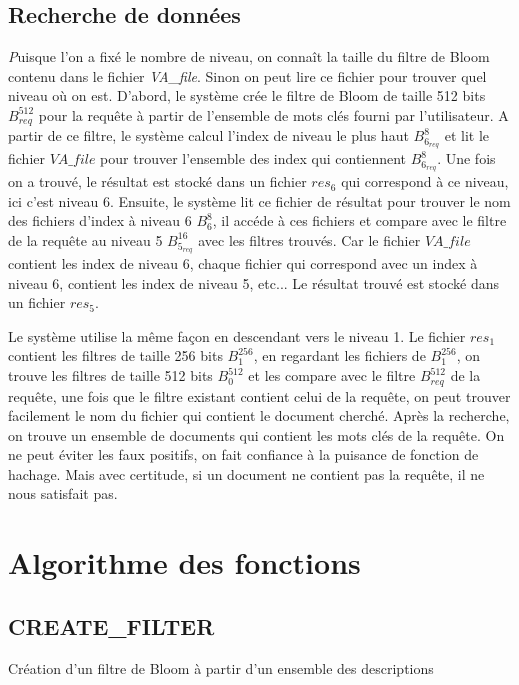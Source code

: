 \section{Recherche de données}
	{\huge \itshape P}uisque l'on a fixé le nombre de niveau, on connaît la taille du filtre de Bloom contenu dans le fichier \textit{VA\_file}. Sinon on peut lire ce fichier pour trouver quel niveau où on est. D'abord, le système crée le filtre de Bloom de taille 512 bits $B^{512}_{req}$ pour la requête à partir de l'ensemble de mots clés fourni par l'utilisateur. A partir de ce filtre, le système calcul l'index de niveau le plus haut $B^{8}_{6_{req}}$ et lit le fichier $VA\_file$ pour trouver l'ensemble des index qui contiennent $B^{8}_{6_{req}}$. Une fois on a trouvé, le résultat est stocké dans un fichier $res_6$ qui correspond à ce niveau, ici c'est niveau 6. Ensuite, le système lit ce fichier de résultat pour trouver le nom des fichiers d'index à niveau 6 $B^{8}_{6}$, il accéde à ces fichiers et compare avec le filtre de la requête au niveau 5 $B^{16}_{5_{req}}$ avec les filtres trouvés. Car le fichier $VA\_file$ contient les index de niveau 6, chaque fichier qui correspond avec un index à niveau 6, contient les index de niveau 5, etc... Le résultat trouvé est stocké dans un fichier $res_5$. 
	
	Le système utilise la même façon en descendant vers le niveau 1. Le fichier $res_1$ contient les filtres de taille 256 bits $B^{256}_{1}$, en regardant les fichiers de $B^{256}_{1}$, on trouve les filtres de taille 512 bits $B^{512}_{0}$ et les compare avec le filtre $B^{512}_{req}$ de la requête, une fois que le filtre existant contient celui de la requête, on peut trouver facilement le nom du fichier qui contient le document cherché. Après la recherche, on trouve un ensemble de documents qui contient les mots clés de la requête. On ne peut éviter les faux positifs, on fait confiance à la puisance de fonction de hachage. Mais avec certitude, si un document ne contient pas la requête, il ne nous satisfait pas.

\chapter{Algorithme des fonctions}
\section{CREATE\_FILTER}
\begin{algorithme}
	Création d'un filtre de Bloom à partir d'un ensemble des descriptions
\end{algorithme}

